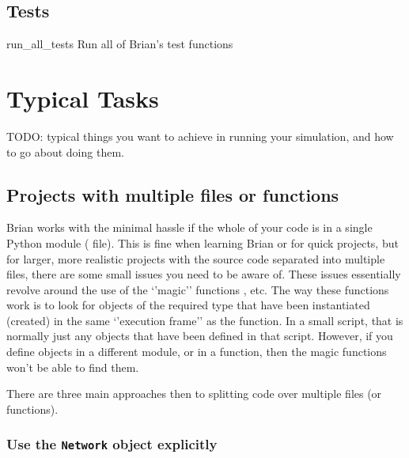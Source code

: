 \documentclass[letterpaper,10pt,english]{manual}
\begin{document}
\resetcurrentobjects
{}

\hypertarget{index-105}{}\section{Tests}

\hypertarget{brian.run_all_tests}{}\begin{funcdesc}{run\_all\_tests}{}
Run all of Brian's test functions
\end{funcdesc}

\resetcurrentobjects


\chapter{Typical Tasks}

TODO: typical things you want to achieve in running your simulation,
and how to go about doing them.

\resetcurrentobjects
{}

\hypertarget{projects-with-multiple-files}{}\section{Projects with multiple files or functions}

Brian works with the minimal hassle if the whole of your code is in a
single Python module ( file). This is fine when learning Brian
or for quick projects, but for larger, more realistic projects with
the source code separated into multiple files, there are some small
issues you need to be aware of. These issues essentially revolve
around the use of the `'magic'' functions \hyperlink{brian.run}{}, etc. The way
these functions work is to look for objects of the required type that
have been instantiated (created) in the same `'execution frame'' as
the \hyperlink{brian.run}{} function. In a small script, that is normally just
any objects that have been defined in that script. However, if you
define objects in a different module, or in a function, then the
magic functions won't be able to find them.

There are three main approaches then to splitting code over multiple
files (or functions).

\hypertarget{index-112}{}\subsection{Use the \texttt{Network} object explicitly}
\end{document}
